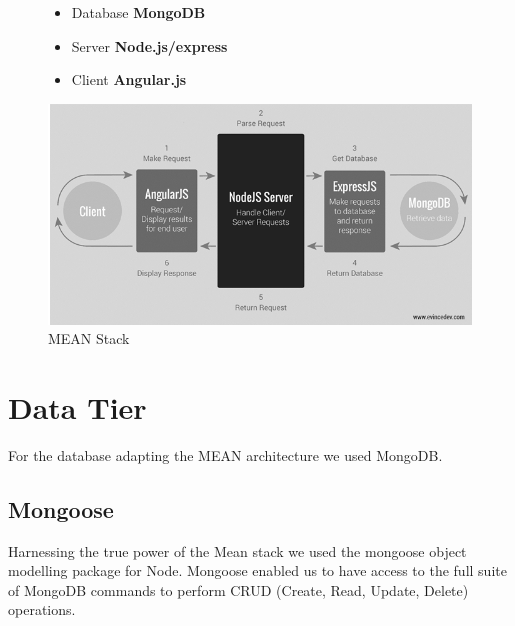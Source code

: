 \begin{figure}[H]
\begin{minipage}{.4\textwidth}  %
\lstset{linewidth = 4cm, breaklines=true} %
\begin{itemize}
\item Database \textbf{MongoDB}
\item Server \textbf{Node.js/express}
\item Client \textbf{Angular.js}
\end{itemize}

\end{minipage}
\qquad %
\begin{minipage}{0.6\textwidth} %
\includegraphics[scale=.4]{img/mvc.png} %
\caption{MEAN Stack}
\end{minipage}
\end{figure}

\section{Data Tier}
For the database adapting the MEAN architecture we used MongoDB.

\subsection{Mongoose}
Harnessing the true power of the Mean stack we used the mongoose object modelling package for Node. Mongoose enabled us to have access to the full suite of MongoDB commands to perform CRUD (Create, Read, Update, Delete) operations. 


